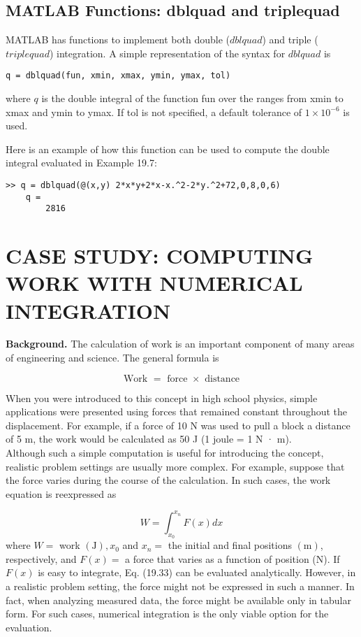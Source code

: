 \documentclass[../main.tex]{subfiles}
\begin{document}
\subsection{MATLAB Functions: dblquad and triplequad}
MATLAB has functions to implement both double ($dblquad$) and triple ($triplequad$)
integration. A simple representation of the syntax for $dblquad$ is

\begin{lstlisting}[numbers=none]
	q = dblquad(fun, xmin, xmax, ymin, ymax, tol)
\end{lstlisting}

where $q$ is the double integral of the function fun over the ranges from xmin to xmax and ymin to ymax. If tol is not specified, a default tolerance of $1 \times 10^{-6}$ is used.

Here is an example of how this function can be used to compute the double integral evaluated in Example 19.7:

\begin{lstlisting}[numbers=none]
	>> q = dblquad(@(x,y) 2*x*y+2*x-x.^2-2*y.^2+72,0,8,0,6)
	q =
		2816
\end{lstlisting}

\section{CASE STUDY: COMPUTING WORK WITH NUMERICAL INTEGRATION}
\noindent \textbf{Background.} The calculation of work is an important component of many areas of
engineering and science. The general formula is

$$
		\text { Work }= \text { force } \times \text { distance }
		$$

		When you were introduced to this concept in high school physics, simple applications were
		presented using forces that remained constant throughout the displacement. For example,
		if a force of 10 N was used to pull a block a distance of 5 m, the work would be calculated
		as 50 J (1 joule = 1 N · m).\\
		Although such a simple computation is useful for introducing the concept, realistic
		problem settings are usually more complex. For example, suppose that the force varies during the course of the calculation. In such cases, the work equation is reexpressed as

		\begin{equation}
			\tag{19.33}
W=\int_{x_{0}}^{x_{n}} F(x) d x
\end{equation}
where $W=$ work $(\mathrm{J}), x_{0}$ and $x_{n}=$ the initial and final positions $(\mathrm{m})$, respectively, and $F(x)=$ a force that varies as a function of position (N). If $F(x)$ is easy to integrate, Eq. (19.33) can be evaluated analytically. However, in a realistic problem setting, the force might not be expressed in such a manner. In fact, when analyzing measured data, the force might be available only in tabular form. For such cases, numerical integration is the only viable option for the evaluation.
\end{document}
